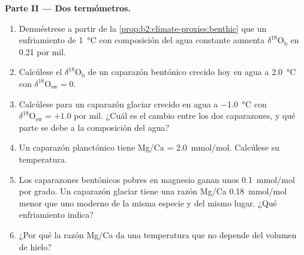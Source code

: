 \begin{problem}
\medskip\noindent\textbf{Parte II --- Dos termómetros.}
\begin{enumerate}[resume]
  \item Demuéstrese a partir de la \cref{prop:b2:climate-proxies:benthic} que un enfriamiento de \qty{1}{\celsius} con
        composición del agua constante aumenta $\delta^{18}\mathrm{O}_{\mathrm{b}}$ en \num{0.21} por mil.
  \item Calcúlese el $\delta^{18}\mathrm{O}_{\mathrm{b}}$ de un caparazón bentónico crecido hoy en agua a
        \qty{2.0}{\celsius} con $\delta^{18}\mathrm{O}_{\mathrm{sw}} = 0$.
  \item Calcúlese para un caparazón glaciar crecido en agua a \qty{-1.0}{\celsius} con
        $\delta^{18}\mathrm{O}_{\mathrm{sw}} = +1.0$ por mil. ¿Cuál es el cambio entre los dos
        caparazones, y qué parte se debe a la composición del agua?
  \item Un caparazón planctónico tiene Mg/Ca = \qty{2.0}{mmol/mol}. Calcúlese su temperatura.
  \item Los caparazones bentónicos pobres en magnesio ganan unos \qty{0.1}{mmol/mol} por grado. Un caparazón glaciar tiene
        una razón Mg/Ca \qty{0.18}{mmol/mol} menor que uno moderno de la misma especie y del mismo
        lugar. ¿Qué enfriamiento indica?
  \item ¿Por qué la razón Mg/Ca da una temperatura que no depende del volumen de hielo?
\end{enumerate}


\end{problem}
